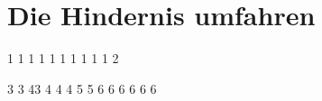 \renewcommand{\autoren}{Valentyn Chepil}
\newpage
\section{Die Hindernis umfahren}

1
1
1
1
1
1
1
1
1
1
2

3
3
43
4
4
4
5
5
6
6
6
6
6
6
